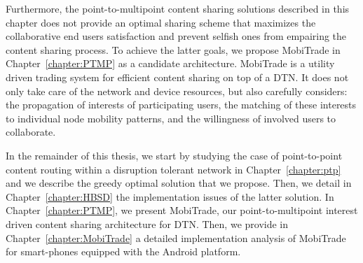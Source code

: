 Furthermore, the point-to-multipoint content sharing solutions described in this chapter does not provide an optimal sharing scheme that maximizes the collaborative end users satisfaction and prevent selfish ones from empairing the content sharing process. To achieve the latter goals, we propose MobiTrade in Chapter~\ref{chapter:PTMP} as a candidate architecture. MobiTrade is a utility driven trading system for efficient content sharing on top of a DTN. It does not only take care of the network and device resources, but also carefully considers: the propagation of interests of participating users, the matching of these interests to individual node mobility patterns, and the willingness of involved users to collaborate.

In the remainder of this thesis, we start by studying the case of point-to-point content routing within a disruption tolerant network in Chapter~\ref{chapter:ptp} and we describe the greedy optimal solution that we propose. Then, we detail in Chapter~\ref{chapter:HBSD} the implementation issues of the latter solution. In Chapter~\ref{chapter:PTMP}, we present MobiTrade, our point-to-multipoint interest driven content sharing architecture for DTN. Then, we provide in Chapter~\ref{chapter:MobiTrade} a detailed implementation analysis of MobiTrade for smart-phones equipped with the Android platform.


